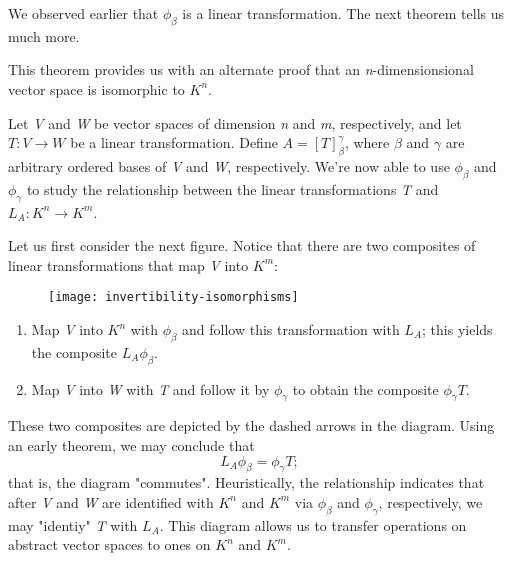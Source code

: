 We observed earlier that $\phi_\beta$ is a linear transformation. The next theorem tells us much more.


This theorem provides us with an alternate proof that an \textit{n}-dimensionsional vector space is isomorphic to $K^n$.

Let \textit{V} and \textit{W} be vector spaces of dimension \textit{n} and \textit{m}, respectively, and let $T : V \rightarrow W$ be a linear transformation. Define $A = [T]_\beta^\gamma$, where $\beta$ and $\gamma$ are arbitrary ordered bases of \textit{V} and \textit{W}, respectively. We're now able to use $\phi_\beta$ and $\phi_\gamma$ to study the relationship between the linear transformations \textit{T} and $L_A : K^n \rightarrow K^m$.

Let us first consider the next figure. Notice that there are two composites of linear transformations that map \textit{V} into $K^m$:

\begin{figure}[h!]
  \centering
  \texttt{[image: invertibility-isomorphisms]} 
\end{figure}

\begin{enumerate}
  \item Map \textit{V} into $K^n$ with $\phi_\beta$ and follow this transformation with $L_A$; this yields the composite $L_A \phi_\beta$.
  \item Map \textit{V} into \textit{W} with \textit{T} and follow it by $\phi_\gamma$ to obtain the composite $\phi_\gamma T$.
\end{enumerate}

These two composites are depicted by the dashed arrows in the diagram. Using an early theorem, we may conclude that 
\[L_A \phi_\beta = \phi_\gamma T;\]
that is, the diagram "commutes". Heuristically, the relationship indicates that after \textit{V} and \textit{W} are identified with $K^n$ and $K^m$ via $\phi_\beta$ and $\phi_\gamma$, respectively, we may "identiy" \textit{T} with $L_A$. This diagram allows us to transfer operations on abstract vector spaces to ones on $K^n$ and $K^m$.

